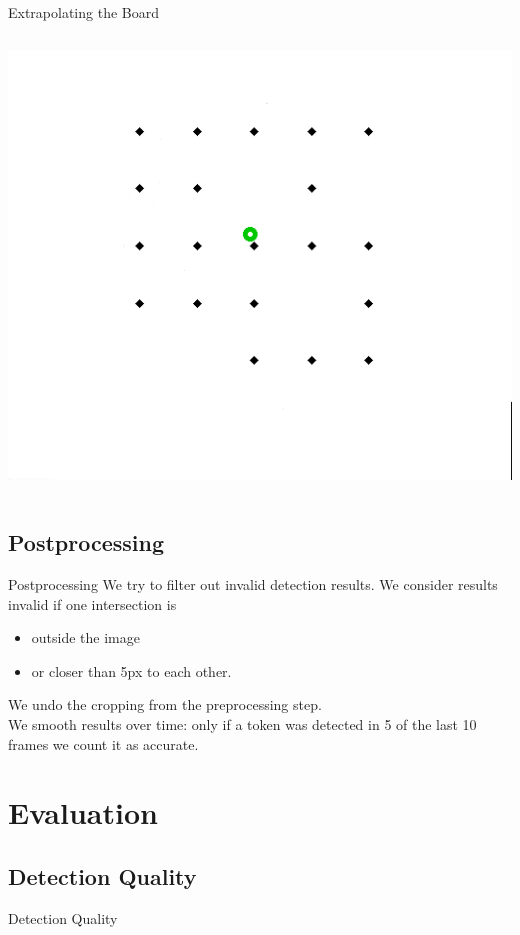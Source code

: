 \documentclass[table]{beamer}
\begin{document}
\begin{frame}{Extrapolating the Board}
\begin{columns}
\begin{column}{0.3\textwidth}
			\includegraphics[width=\columnwidth]{images/builtModel.png}
		\end{column}
	\end{columns}
\end{frame}
\subsection{Postprocessing}
\begin{frame}{Postprocessing}
	We try to filter out invalid detection results. We consider results invalid if one intersection is
	\begin{itemize}
		\item outside the image
		\item or closer than 5px to each other.
	\end{itemize}
	\vspace{0.5cm}

	We undo the cropping from the preprocessing step.\\[0.5cm]

	We smooth results over time: only if a token was detected in 5 of the last 10 frames we count it as accurate.
\end{frame}

\section{Evaluation}
\frame[squeeze]{\tableofcontents[currentsection]}
\subsection{Detection Quality}
\begin{frame}{Detection Quality}~\end{frame}
\end{document}
